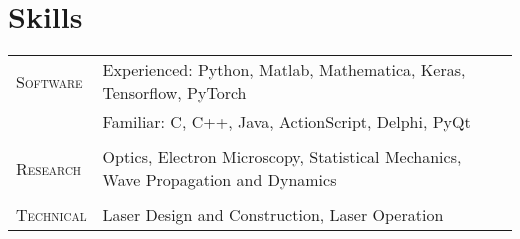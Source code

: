 \section{Skills}

\begin{tabular}{lp{11cm}}
	\textsc{Software}  & Experienced: Python, Matlab, Mathematica, Keras, Tensorflow, PyTorch              \\
	                   & Familiar: C, C++, Java, ActionScript, Delphi, PyQt                                      \\
	                   &                                                                                   \\
	\textsc{Research}  & Optics, Electron Microscopy, Statistical Mechanics, Wave Propagation and Dynamics \\
	                   &                                                                                   \\
	\textsc{Technical} & Laser Design and Construction, Laser Operation
\end{tabular}
